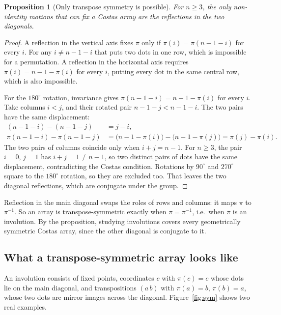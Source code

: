 \documentclass[11pt,a4paper]{article}
\newtheorem{proposition}[theorem]{Proposition}
\theoremstyle{definition}
\begin{document}
\begin{proposition}[Only transpose symmetry is possible]\label{prop:onlytranspose}
For $n\ge3$, the only non-identity motions that can fix a Costas array are the reflections in
the two diagonals.
\end{proposition}
\begin{proof}
A reflection in the vertical axis fixes $\pi$ only if $\pi(i)=\pi(n-1-i)$ for every $i$. For any
$i\ne n-1-i$ that puts two dots in one row, which is impossible for a permutation. A reflection in
the horizontal axis requires $\pi(i)=n-1-\pi(i)$ for every $i$, putting every dot in the same
central row, which is also impossible.

For the $180^\circ$ rotation, invariance gives $\pi(n-1-i)=n-1-\pi(i)$ for every $i$. Take
columns $i<j$, and their rotated pair $n-1-j<n-1-i$. The two pairs have the same displacement:
\[
\begin{aligned}
(n-1-i)-(n-1-j) &= j-i,\\
\pi(n-1-i)-\pi(n-1-j) &= \bigl(n-1-\pi(i)\bigr)-\bigl(n-1-\pi(j)\bigr)=\pi(j)-\pi(i).
\end{aligned}
\]
The two pairs of columns coincide only when $i+j=n-1$. For $n\ge3$, the pair $i=0$, $j=1$ has
$i+j=1\ne n-1$, so two distinct pairs of dots have the same displacement, contradicting the Costas
condition. Rotations by $90^\circ$ and $270^\circ$ square to the $180^\circ$ rotation, so they are
excluded too. That leaves the two diagonal reflections, which are conjugate under the group.
\end{proof}

Reflection in the main diagonal swaps the roles of rows and columns: it maps $\pi$ to
$\pi^{-1}$. So an array is transpose-symmetric exactly when $\pi=\pi^{-1}$, i.e.\ when
$\pi$ is an involution. By the proposition, studying involutions covers every geometrically symmetric
Costas array, since the other diagonal is conjugate to it.

\subsection{What a transpose-symmetric array looks like}

An involution consists of fixed points, coordinates $c$ with $\pi(c)=c$ whose dots lie
on the main diagonal, and transpositions $(a\,b)$ with $\pi(a)=b$, $\pi(b)=a$, whose
two dots are mirror images across the diagonal. Figure~\ref{fig:sym} shows two real examples.
\end{document}
